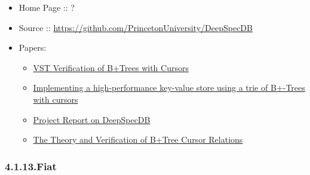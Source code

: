 \documentclass[12pt,twoside]{article}
\begin{document}
\begin{itemize}[noitemsep,topsep=\mdcompacttopsep]%

\item{}Home Page :: ?%

\item{}Source :: \href{https://github.com/PrincetonUniversity/DeepSpecDB}{{\ttfamily https://\hspace{0pt}github.\hspace{0pt}com/\hspace{0pt}PrincetonUniversity/\hspace{0pt}DeepSpecDB}}%

\item{}Papers:

\begin{itemize}[noitemsep,topsep=\mdcompacttopsep]%

\item{}\href{http://perso.eleves.ens-rennes.fr/people/Aurele.Barriere/papers/vstbtrees.pdf}{VST Verification of B+Trees with Cursors}%

\item{}\href{https://github.com/PrincetonUniversity/DeepSpecDB/blob/master/papers/adewale/Masters_Thesis.pdf}{Implementing a high-performance key-value store using a trie of B+-Trees with cursors}%

\item{}\href{https://github.com/PrincetonUniversity/DeepSpecDB/blob/master/papers/luke/report.pdf}{Project Report on DeepSpecDB}%

\item{}\href{https://github.com/PrincetonUniversity/DeepSpecDB/blob/master/papers/mcswiggen/McSwiggen-Thesis.pdf}{The Theory and Verification of B+Tree Cursor Relations}%
\end{itemize}%
\end{itemize}%

\subsubsection{4.1.13.\hspace*{0.5em}Fiat}\label{sec-fiat}%
\end{document}
